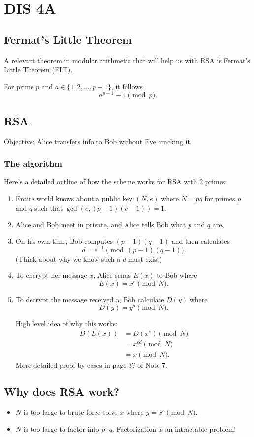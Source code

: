 \section{DIS 4A}

\subsection{Fermat's Little Theorem}

A relevant theorem in modular arithmetic that will help us with RSA is Fermat's Little Theorem (FLT).

\begin{theorem}
    For prime $p$ and $a \in \{1, 2, \ldots, p-1\}$, it follows \[ a^{p-1} \equiv 1 \pmod{p}. \]
\end{theorem}

\subsection{RSA}
Objective: Alice transfers info to Bob without Eve cracking it. 
\subsubsection{The algorithm}
Here's a detailed outline of how the scheme works for RSA with 2 primes:
\begin{enumerate}
    \item Entire world knows about a public key $(N,e)$ where $N = pq$ for primes $p$ and $q$ such that $\gcd(e, (p-1)(q-1)) = 1.$
    \item Alice and Bob meet in private, and Alice tells Bob what $p$ and $q$ are.
    \item On his own time, Bob computes $(p-1)(q-1)$ and then calculates \[ d = e^{-1} \pmod{(p-1)(q-1)}. \] (Think about why we know such a $d$ must exist)
    \item To encrypt her message $x$, Alice sends $E(x)$ to Bob where \[ E(x) = x^{e} \pmod{N}. \]
    \item To decrypt the message received $y$, Bob calculate $D(y)$ where \[ D(y) = y^{d} \pmod{N}. \]
    
    High level idea of why this works: \begin{align*}
        D(E(x)) &= D(x^{e}) \pmod{N}\\
        &= x^{ed} \pmod{N} \\
        &= x \pmod{N}.
    \end{align*}
    More detailed proof by cases in page 3? of Note 7. 
\end{enumerate}

\subsection{Why does RSA work?}
\begin{itemize}
    \item $N$ is too large to brute force solve $x$ where $y = x^{e} \pmod{N}$. 
    \item $N$ is too large to factor into $p \cdot q$. Factorization is an intractable problem!
\end{itemize}